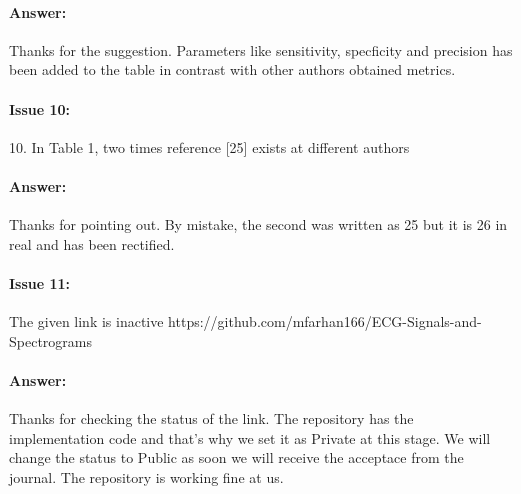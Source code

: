 \documentclass{article}
\begin{document}
\paragraph{Answer:}
Thanks for the suggestion. Parameters like sensitivity, specficity and precision has been added to the table in contrast with other authors obtained metrics. 

\paragraph{Issue 10:}
\begin{displayquote}
10. In Table 1, two times reference [25] exists at different authors
\end{displayquote}

\paragraph{Answer:}
Thanks for pointing out. By mistake, the second was written as 25 but it is 26 in real and has been rectified.

\paragraph{Issue 11:}
\begin{displayquote}
The given link is inactive https://github.com/mfarhan166/ECG-Signals-and-Spectrograms
\end{displayquote}

\paragraph{Answer:}
Thanks for checking the status of the link. The repository has the implementation code and that's why we set it as Private at this stage. We will change the status to Public as soon we will receive the acceptace from the journal. The repository is working fine at us. 
\end{document}
